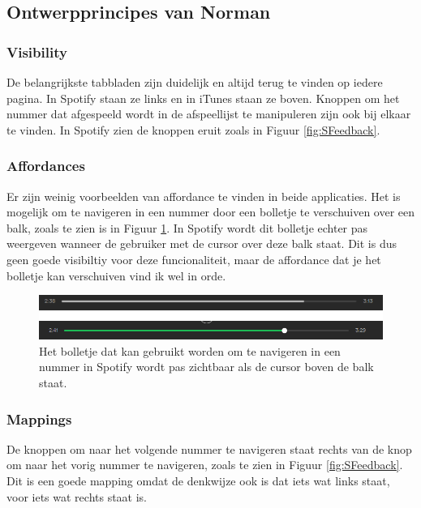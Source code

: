 \documentclass[11pt]{article}
\begin{document}
\subsection{Ontwerpprincipes van Norman}
\subsubsection{Visibility}
De belangrijkste tabbladen zijn duidelijk en altijd terug te vinden op iedere pagina. In Spotify staan ze links en in iTunes staan ze boven. Knoppen om het nummer dat afgespeeld wordt in de afspeellijst te manipuleren zijn ook bij elkaar te vinden. In Spotify zien de knoppen eruit zoals in Figuur \ref{fig:SFeedback}.
\subsubsection{Affordances}
Er zijn weinig voorbeelden van affordance te vinden in beide applicaties. Het is mogelijk om te navigeren in een nummer door een bolletje te verschuiven over een balk, zoals te zien is in Figuur \ref{fig:SScrolbalk}. In Spotify wordt dit bolletje echter pas weergeven wanneer de gebruiker met de cursor over deze balk staat. Dit is dus geen goede visibiltiy voor deze funcionaliteit, maar de affordance dat je het bolletje kan verschuiven vind ik wel in orde.
\begin{figure}
	\centering
	\includegraphics[width=0.9\linewidth]{SScrolbalk.png}
	\caption{Het bolletje dat kan gebruikt worden om te navigeren in een nummer in Spotify wordt pas zichtbaar als de cursor boven de balk staat.}
	\label{fig:SScrolbalk}
\end{figure}
\subsubsection{Mappings}
De knoppen om naar het volgende nummer te navigeren staat rechts van de knop om naar het vorig nummer te navigeren, zoals te zien in Figuur \ref{fig:SFeedback}. Dit is een goede mapping omdat de denkwijze ook is dat iets wat links staat, voor iets wat rechts staat is.
\end{document}
